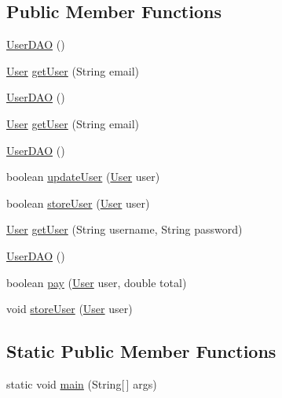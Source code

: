 \subsection*{Public Member Functions}
\begin{DoxyCompactItemize}
\item 
\mbox{\hyperlink{class_s_p_q_1_1dao_1_1_user_d_a_o_ae1c3b0aaf2795cc7d4afec61cce3ec02}{User\+D\+AO}} ()
\item 
\mbox{\hyperlink{class_s_p_q_1_1data_1_1_user}{User}} \mbox{\hyperlink{class_s_p_q_1_1dao_1_1_user_d_a_o_aeb3901e9e260ad977a1b412fe7a9fc0e}{get\+User}} (String email)
\item 
\mbox{\hyperlink{class_s_p_q_1_1dao_1_1_user_d_a_o_ae1c3b0aaf2795cc7d4afec61cce3ec02}{User\+D\+AO}} ()
\item 
\mbox{\hyperlink{class_s_p_q_1_1data_1_1_user}{User}} \mbox{\hyperlink{class_s_p_q_1_1dao_1_1_user_d_a_o_aeb3901e9e260ad977a1b412fe7a9fc0e}{get\+User}} (String email)
\item 
\mbox{\hyperlink{class_s_p_q_1_1dao_1_1_user_d_a_o_ae1c3b0aaf2795cc7d4afec61cce3ec02}{User\+D\+AO}} ()
\item 
boolean \mbox{\hyperlink{class_s_p_q_1_1dao_1_1_user_d_a_o_a525b7db52aab94cfe24aeac14949504e}{update\+User}} (\mbox{\hyperlink{class_s_p_q_1_1data_1_1_user}{User}} user)
\item 
boolean \mbox{\hyperlink{class_s_p_q_1_1dao_1_1_user_d_a_o_ad86d4148c7f3fd960fb32de7c68f3f6a}{store\+User}} (\mbox{\hyperlink{class_s_p_q_1_1data_1_1_user}{User}} user)
\item 
\mbox{\hyperlink{class_s_p_q_1_1data_1_1_user}{User}} \mbox{\hyperlink{class_s_p_q_1_1dao_1_1_user_d_a_o_a2fe3e16e787f453b37f061de24cc49eb}{get\+User}} (String username, String password)
\item 
\mbox{\hyperlink{class_s_p_q_1_1dao_1_1_user_d_a_o_ae1c3b0aaf2795cc7d4afec61cce3ec02}{User\+D\+AO}} ()
\item 
boolean \mbox{\hyperlink{class_s_p_q_1_1dao_1_1_user_d_a_o_a8223c677b1ae55147860ea533be434a7}{pay}} (\mbox{\hyperlink{class_s_p_q_1_1data_1_1_user}{User}} user, double total)
\item 
void \mbox{\hyperlink{class_s_p_q_1_1dao_1_1_user_d_a_o_a9cc4105782c52054e71fa4938b55f7aa}{store\+User}} (\mbox{\hyperlink{class_s_p_q_1_1data_1_1_user}{User}} user)
\end{DoxyCompactItemize}
\subsection*{Static Public Member Functions}
\begin{DoxyCompactItemize}
\item 
static void \mbox{\hyperlink{class_s_p_q_1_1dao_1_1_user_d_a_o_a8f6efdd35a56fedb08c9c9c62586c36b}{main}} (String\mbox{[}$\,$\mbox{]} args)
\end{DoxyCompactItemize}



